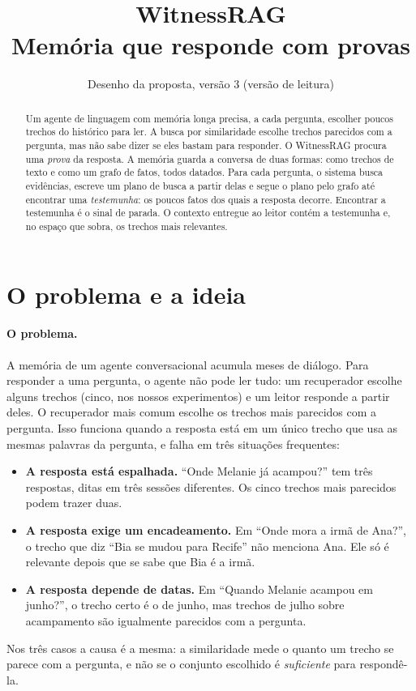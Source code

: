 \documentclass[11pt]{article}
\title{\textbf{WitnessRAG}\\[4pt]
\large Memória que responde com provas}
\author{}
\date{Desenho da proposta, versão 3 (versão de leitura)}
\begin{document}
\maketitle

\begin{abstract}
\noindent
Um agente de linguagem com memória longa precisa, a cada pergunta, escolher
poucos trechos do histórico para ler. A busca por similaridade escolhe trechos
parecidos com a pergunta, mas não sabe dizer se eles bastam para responder. O
WitnessRAG procura uma \emph{prova} da resposta. A memória guarda a conversa
de duas formas: como trechos de texto e como um grafo de fatos, todos datados.
Para cada pergunta, o sistema busca evidências, escreve um plano de busca a
partir delas e segue o plano pelo grafo até encontrar uma \emph{testemunha}:
os poucos fatos dos quais a resposta decorre. Encontrar a testemunha é o sinal
de parada. O contexto entregue ao leitor contém a testemunha e, no espaço que
sobra, os trechos mais relevantes.
\end{abstract}

\section{O problema e a ideia}

\paragraph{O problema.} A memória de um agente conversacional acumula meses
de diálogo. Para responder a uma pergunta, o agente não pode ler tudo:
um recuperador escolhe alguns trechos (cinco, nos nossos experimentos) e um
leitor responde a partir deles. O recuperador mais comum escolhe os trechos
mais parecidos com a pergunta. Isso funciona quando a resposta está em um
único trecho que usa as mesmas palavras da pergunta, e falha em três
situações frequentes:
\begin{itemize}[leftmargin=*,itemsep=2pt]
\item \textbf{A resposta está espalhada.} ``Onde Melanie já acampou?'' tem
  três respostas, ditas em três sessões diferentes. Os cinco trechos mais
  parecidos podem trazer duas.
\item \textbf{A resposta exige um encadeamento.} Em ``Onde mora a irmã de
  Ana?'', o trecho que diz ``Bia se mudou para Recife'' não menciona Ana. Ele
  só é relevante depois que se sabe que Bia é a irmã.
\item \textbf{A resposta depende de datas.} Em ``Quando Melanie acampou em
  junho?'', o trecho certo é o de junho, mas trechos de julho sobre acampamento
  são igualmente parecidos com a pergunta.
\end{itemize}
Nos três casos a causa é a mesma: a similaridade mede o quanto um trecho se
parece com a pergunta, e não se o conjunto escolhido é \emph{suficiente}
para respondê-la.
\end{document}
